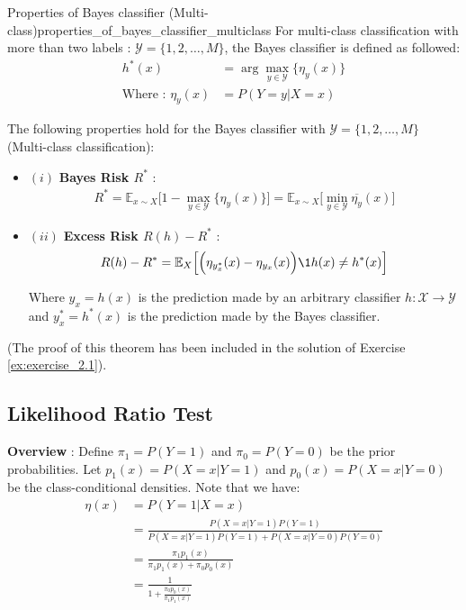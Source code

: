 \begin{theorem}{Properties of Bayes classifier (Multi-class)}{properties_of_bayes_classifier_multiclass}
    For multi-class classification with more than two labels : $\mathcal{Y}=\{1, 2, \dots, M\}$, the Bayes classifier is defined as followed:
    \begin{align*}
        h^*(x) &= \arg\max_{y\in\mathcal{Y}}\Big\{ \eta_y(x) \Big\} \\
        \text{Where : } \eta_y(x) &= P(Y=y|X=x)
    \end{align*}
    
    \noindent\newline The following properties hold for the Bayes classifier with $\mathcal{Y}=\{1, 2, \dots, M\}$ (Multi-class classification):
    \begin{itemize}
        \item $(i)$ \textbf{Bayes Risk $R^*$} :
        \begin{align*}
            R^* = \mathbb{E}_{x\sim X}\Big[ 1 - \max_{y\in\mathcal{Y}}\Big\{ \eta_y(x) \Big\}\Big] = \mathbb{E}_{x\sim X}\Big[\min_{y\in\mathcal{Y}} \overline{\eta_y}(x) \Big]
        \end{align*} 

        \item $(ii)$ \textbf{Excess Risk $R(h)-R^*$} :
        \begin{align*}
            R(h) - R^* = \mathbb{E}_X\Big[ \Big( \eta_{y^*_x}(x) - \eta_{y_x}(x) \Big) \1{h(x)\ne h^*(x)} \Big]
        \end{align*}

        \noindent Where $y_x=h(x)$ is the prediction made by an arbitrary classifier $h:\mathcal{X}\to\mathcal{Y}$ and $y^*_x=h^*(x)$ is the prediction made by the Bayes classifier.
    \end{itemize}
\end{theorem}

\begin{proof*}
    (The proof of this theorem has been included in the solution of Exercise \ref{ex:exercise_2.1}).
\end{proof*}

\subsection{Likelihood Ratio Test}
\textbf{Overview} : Define $\pi_1 = P(Y=1)$ and $\pi_0 = P(Y=0)$ be the prior probabilities. Let $p_1(x)=P(X=x|Y=1)$ and $p_0(x)=P(X=x|Y=0)$ be the class-conditional densities. Note that we have:
\begin{align*}
    \eta(x) &= P(Y=1|X=x) \\
        &= \frac{P(X=x|Y=1)P(Y=1)}{P(X=x|Y=1)P(Y=1) + P(X=x|Y=0)P(Y=0)} \\
        &= \frac{\pi_1p_1(x)}{\pi_1p_1(x) + \pi_0p_0(x)} \\
        &= \frac{1}{1 + \frac{\pi_0p_0(x)}{\pi_1p_1(x)}}
\end{align*}


